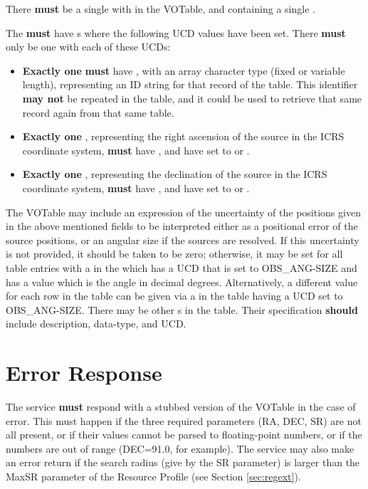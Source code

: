 \documentclass[11pt,a4paper]{ivoa}
\begin{document}
There \textbf{must} be a single  with  in the VOTable, and containing a single .

The  \textbf{must} have s where the following UCD values have been set. There \textbf{must} only be one  with each of these UCDs:
\begin{itemize}
	\item \textbf{Exactly one}  \textbf{must} have , with an array character type (fixed or variable length), representing an ID string for that record of the table. This identifier \textbf{may not} be repeated in the table, and it could be used to retrieve that same record again from that same table.
	\item \textbf{Exactly one} , representing the right ascension of the source in the ICRS coordinate system, \textbf{must} have , and have  set to  or .
	\item \textbf{Exactly one} , representing the declination of the source in the ICRS coordinate system, \textbf{must} have , and have  set to  or .
\end{itemize}

The VOTable may include an expression of the uncertainty of the positions given in the above mentioned fields to be interpreted either as a positional error of the source positions, or an angular size if the sources are resolved. If this uncertainty is not provided, it should be taken to be zero; otherwise, it may be set for all table entries with a  in the  which has a UCD that is set to OBS\_ANG-SIZE and has a value which is the angle in decimal degrees. Alternatively, a different value for each row in the table can be given via a  in the table having a UCD set to OBS\_ANG-SIZE.
There may be other s in the table. Their specification \textbf{should} include description, data-type, and UCD.

\section{Error Response}
\label{sec:error}
The service \textbf{must} respond with a stubbed version of the VOTable in the case of error. This must happen if the three required parameters (RA, DEC, SR) are not all present, or if their values cannot be parsed to floating-point numbers, or if the numbers are out of range (DEC=91.0, for example). The service may also make an error return if the search radius (give by the SR parameter) is larger than the MaxSR parameter of the Resource Profile (see Section \ref{sec:regext}).
\end{document}
